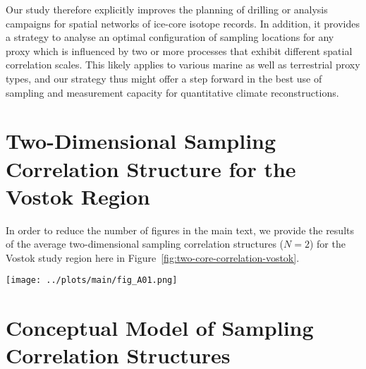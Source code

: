 \documentclass[draft]{agujournal2019}
\begin{document}
Our study therefore explicitly improves the planning of drilling or analysis
campaigns for spatial networks of ice-core isotope records. In addition, it
provides a strategy to analyse an optimal configuration of sampling locations
for any proxy which is influenced by two or more processes that exhibit
different spatial correlation scales. This likely applies to various marine as
well as terrestrial proxy types, and our strategy thus might offer a step
forward in the best use of sampling and measurement capacity for quantitative
climate reconstructions.

\appendix

\section{Two-Dimensional Sampling Correlation Structure for the Vostok Region}
\label{app:vostok.n2}

In order to reduce the number of figures in the main text, we provide the
results of the average two-dimensional sampling correlation structures ($N=2$)
for the Vostok study region here in Figure~\ref{fig:two-core-correlation-vostok}.

\begin{figure*}[t]%
\centering
\texttt{[image: ../plots/main/fig\_A01.png]}
\caption{%
  Sampling correlation structure with temperature in the two-dimensional case of
  sampling two locations in the Vostok region. Shown is the mean correlation of
  all possible single correlations for the average of two grid cells of
  (a) $T_{\mathrm{2m}}$, (b) $T_{\mathrm{2m}}^{\mathrm{(pw)}}$ and (c)
  $\delta^{18}\mathrm{O}^{\mathrm{(pw)}}$ time series sampled from the same ring
  or from two different rings, averaged over all target sites in the given
  region. The axes display the distance from the target site, where the $x$
  ($y$) axis represents for the first (second) sampled ring and the tick marks
  indicate the midpoint radii of the rings. Note that for
  $\delta^{18}\mathrm{O}^{\mathrm{(pw)}}$ the -- albeit marginal -- correlation
  maximum is achieved by combining the innermost ring with the ring between
  $500$--$750$\,km.}
\label{fig:two-core-correlation-vostok}%
\end{figure*}%

\section{Conceptual Model of Sampling Correlation Structures}
\label{app:concept.model}
\end{document}
